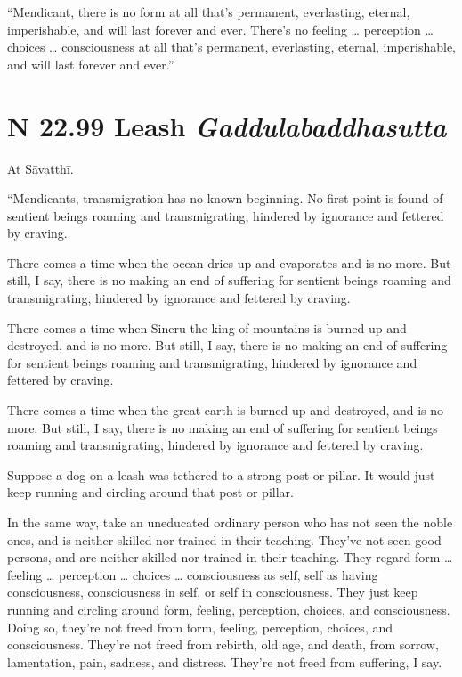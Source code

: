 \documentclass[12pt,openany]{book}%
\newcommand*{\suttatitleacronym}[1]{\smaller[2]{#1}\vspace*{.3em}}
\newcommand*{\suttatitletranslation}[1]{\linebreak{#1}}
\newcommand*{\suttatitleroot}[1]{\linebreak\smaller[2]\itshape{#1}}
\newcommand*{\tocacronym}[1]{\hspace*{-3.3em}{#1}\quad}
\newcommand*{\toctranslation}[1]{#1}
\newcommand*{\tocroot}[1]{(\textit{#1})}
\begin{document}
“Mendicant, there is no form at all that’s permanent, everlasting, eternal, imperishable, and will last forever and ever. There’s no feeling … perception … choices … consciousness at all that’s permanent, everlasting, eternal, imperishable, and will last forever and ever.” 

%
\section*{{\suttatitleacronym SN 22.99}{\suttatitletranslation A Leash }{\suttatitleroot Gaddulabaddhasutta}}
\addcontentsline{toc}{section}{\tocacronym{SN 22.99} \toctranslation{A Leash } \tocroot{Gaddulabaddhasutta}}

At \textsanskrit{Sāvatthī}. 

“Mendicants, transmigration has no known beginning. No first point is found of sentient beings roaming and transmigrating, hindered by ignorance and fettered by craving. 

There comes a time when the ocean dries up and evaporates and is no more. But still, I say, there is no making an end of suffering for sentient beings roaming and transmigrating, hindered by ignorance and fettered by craving. 

There comes a time when Sineru the king of mountains is burned up and destroyed, and is no more. But still, I say, there is no making an end of suffering for sentient beings roaming and transmigrating, hindered by ignorance and fettered by craving. 

There comes a time when the great earth is burned up and destroyed, and is no more. But still, I say, there is no making an end of suffering for sentient beings roaming and transmigrating, hindered by ignorance and fettered by craving. 

Suppose a dog on a leash was tethered to a strong post or pillar. It would just keep running and circling around that post or pillar. 

In the same way, take an uneducated ordinary person who has not seen the noble ones, and is neither skilled nor trained in their teaching. They’ve not seen good persons, and are neither skilled nor trained in their teaching. They regard form … feeling … perception … choices … consciousness as self, self as having consciousness, consciousness in self, or self in consciousness. They just keep running and circling around form, feeling, perception, choices, and consciousness. Doing so, they’re not freed from form, feeling, perception, choices, and consciousness. They’re not freed from rebirth, old age, and death, from sorrow, lamentation, pain, sadness, and distress. They’re not freed from suffering, I say. 
\end{document}
